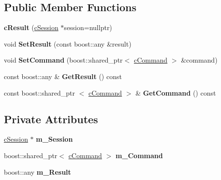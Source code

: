 \subsection*{\-Public \-Member \-Functions}
\begin{DoxyCompactItemize}
\item 
\hypertarget{classengine_1_1cResult_ac1c1911d8d840623194dbbc8d6110c1d}{{\bfseries c\-Result} (\hyperlink{classengine_1_1cSession}{c\-Session} $\ast$session=nullptr)}\label{classengine_1_1cResult_ac1c1911d8d840623194dbbc8d6110c1d}

\item 
\hypertarget{classengine_1_1cResult_ad72c10e84728768e45adbe9a653e4295}{void {\bfseries \-Set\-Result} (const boost\-::any \&result)}\label{classengine_1_1cResult_ad72c10e84728768e45adbe9a653e4295}

\item 
\hypertarget{classengine_1_1cResult_a52fb0a3d7932817ca9d1f48c4f18bfa6}{void {\bfseries \-Set\-Command} (boost\-::shared\-\_\-ptr$<$ \hyperlink{classengine_1_1cCommand}{c\-Command} $>$ \&command)}\label{classengine_1_1cResult_a52fb0a3d7932817ca9d1f48c4f18bfa6}

\item 
\hypertarget{classengine_1_1cResult_ab1b5a9a971a31c6bfe9c1deeab868476}{const boost\-::any \& {\bfseries \-Get\-Result} () const }\label{classengine_1_1cResult_ab1b5a9a971a31c6bfe9c1deeab868476}

\item 
\hypertarget{classengine_1_1cResult_ac555ea8c50a7e640518f2bc0a23f6fc0}{const boost\-::shared\-\_\-ptr\*
$<$ \hyperlink{classengine_1_1cCommand}{c\-Command} $>$ \& {\bfseries \-Get\-Command} () const }\label{classengine_1_1cResult_ac555ea8c50a7e640518f2bc0a23f6fc0}

\end{DoxyCompactItemize}
\subsection*{\-Private \-Attributes}
\begin{DoxyCompactItemize}
\item 
\hypertarget{classengine_1_1cResult_ab4a2a6e829775978c141dc4f18398321}{\hyperlink{classengine_1_1cSession}{c\-Session} $\ast$ {\bfseries m\-\_\-\-Session}}\label{classengine_1_1cResult_ab4a2a6e829775978c141dc4f18398321}

\item 
\hypertarget{classengine_1_1cResult_afeb8b6135345e8062460685440799b74}{boost\-::shared\-\_\-ptr$<$ \hyperlink{classengine_1_1cCommand}{c\-Command} $>$ {\bfseries m\-\_\-\-Command}}\label{classengine_1_1cResult_afeb8b6135345e8062460685440799b74}

\item 
\hypertarget{classengine_1_1cResult_a445a8b5495ec68e809fe85b5876a5bc7}{boost\-::any {\bfseries m\-\_\-\-Result}}\label{classengine_1_1cResult_a445a8b5495ec68e809fe85b5876a5bc7}

\end{DoxyCompactItemize}


